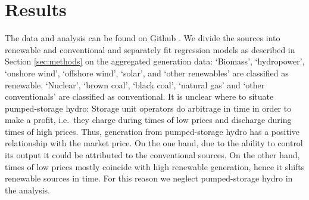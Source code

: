 \documentclass{article}
\begin{document}




\section{Results}
The data and analysis can be found on Github \citep{github_repo}.
We divide the sources into renewable and conventional and separately fit regression models as described in Section \ref{sec:methods} on the aggregated generation data:
\enquote*{Biomass}, \enquote*{hydropower}, \enquote*{onshore wind}, \enquote*{offshore wind}, \enquote*{solar}, and \enquote*{other renewables} are classified as renewable.
\enquote*{Nuclear}, \enquote*{brown coal}, \enquote*{black coal}, \enquote*{natural gas} and \enquote*{other conventionals} are classified as conventional.
It is unclear where to situate pumped-storage hydro:
Storage unit operators do arbitrage in time in order to make a profit, i.e.\ they charge during times of low prices and discharge during times of high prices.
Thus, generation from pumped-storage hydro has a positive relationship with the market price.
On the one hand, due to the ability to control its output it could be attributed to the conventional sources.
On the other hand, times of low prices mostly coincide with high renewable generation, hence it shifts renewable sources in time.
For this reason we neglect pumped-storage hydro in the analysis.
\end{document}
